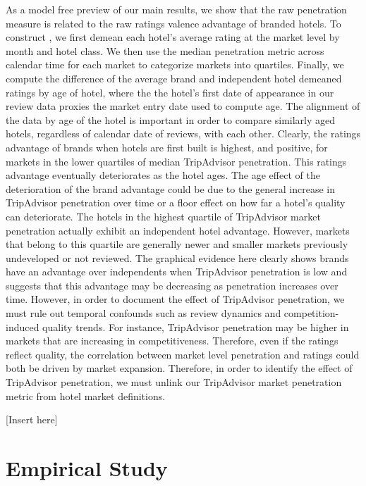 \documentclass[mksc,blindrev]{informs3} %
\begin{document}
As a model free preview of our main results, we show that the raw penetration measure is related to the raw ratings valence advantage of branded hotels. To construct , we first demean each hotel's average rating at the market level by month and hotel class. We then use the median penetration metric across calendar time for each market to categorize markets into quartiles. Finally, we compute the difference of the average brand and independent hotel demeaned ratings by age of hotel, where the the hotel's first date of appearance in our review data proxies the market entry date used to compute age. The alignment of the data by age of the hotel is important in order to compare similarly aged hotels, regardless of calendar date of reviews, with each other. Clearly, the ratings advantage of brands when hotels are first built is highest, and positive, for markets in the lower quartiles of median TripAdvisor penetration. This ratings advantage eventually deteriorates as the hotel ages. The age effect of the deterioration of the brand advantage could be due to the general increase in TripAdvisor penetration over time or a floor effect on how far a hotel's quality can deteriorate. The hotels in the highest quartile of TripAdvisor market penetration actually exhibit an independent hotel advantage. However, markets that belong to this quartile are generally newer and smaller markets previously undeveloped or not reviewed. The graphical evidence here clearly shows brands have an advantage over independents when TripAdvisor penetration is low and suggests that this advantage may be decreasing as penetration increases over time. However, in order to document the effect of TripAdvisor penetration, we must rule out temporal confounds such as review dynamics and competition-induced quality trends. For instance, TripAdvisor penetration may be higher in markets that are increasing in competitiveness. Therefore, even if the ratings reflect quality, the correlation between market level penetration and ratings could both be driven by market expansion. Therefore, in order to identify the effect of TripAdvisor penetration, we must unlink our TripAdvisor market penetration metric from hotel market definitions.

[Insert  here]

\section{Empirical Study}\label{sec:maineffect} 
\end{document}
